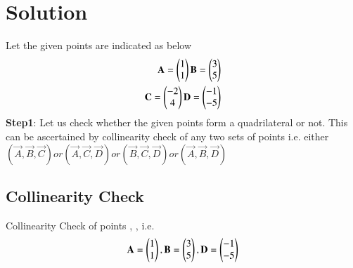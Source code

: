 \documentclass[journal,12pt,twocolumn]{IEEEtran}
\begin{document}
\section{Solution}
Let the given points are indicated as below\\

\begin{align}
\begin{split}
\mathbf{\textbf{A}} = \begin{pmatrix}1 \\ 1\end{pmatrix}
\mathbf{\textbf{B}} = \begin{pmatrix}3 \\ 5\end{pmatrix}\\
\mathbf{\textbf{C}} = \begin{pmatrix}-2 \\ 4\end{pmatrix}
\mathbf{\textbf{D}} = \begin{pmatrix}-1 \\ -5\end{pmatrix}\\
\end{split}
\end{align}
\textbf{Step1}: Let us check whether the given points form a quadrilateral or not. This can be ascertained by collinearity check of any two sets of points i.e.
						either \begin{math}
						    	(\vec{A}, \vec{B}, \vec{C}) or (\vec{A}, \vec{C}, \vec{D}) or (\vec{B}, \vec{C}, \vec{D}) or (\vec{A}, \vec{B}, \vec{D})					\end{math}

\subsection{\textbf{Collinearity Check}}
Collinearity Check of points , ,  i.e. 
\begin{align}
\begin{split}
\mathbf{A} = \begin{pmatrix}1 \\ 1\end{pmatrix},\mathbf{B} = \begin{pmatrix}3 \\ 5\end{pmatrix},\mathbf{D} = \begin{pmatrix}-1 \\ -5\end{pmatrix}\\
\end{split}
\end{align}
\end{document}
